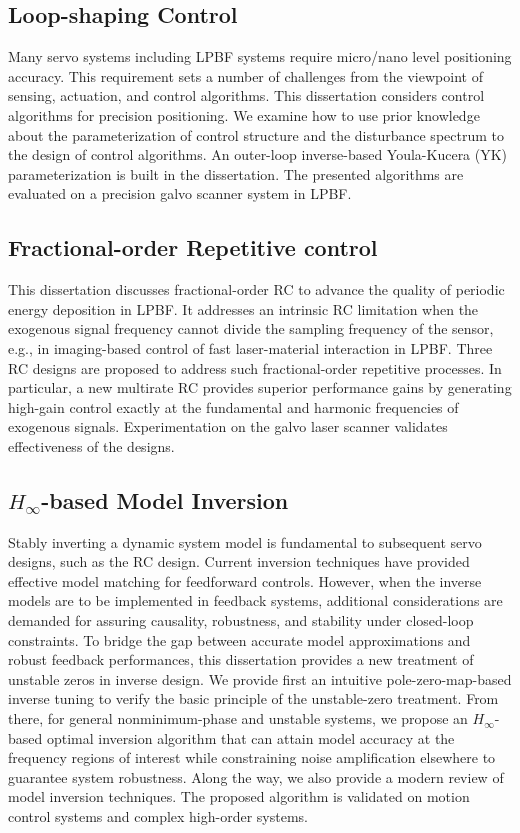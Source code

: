 \documentclass [11pt, proquest] {uwthesis}[2020/02/24]
\begin{document}
\subsection*{Loop-shaping Control}
Many servo systems including LPBF systems require micro/nano level positioning accuracy. This requirement sets a number of challenges from the viewpoint of sensing, actuation, and control algorithms. This dissertation considers control algorithms for precision positioning. We examine how to use prior knowledge about the parameterization of control structure and the disturbance spectrum to the design of control algorithms. An outer-loop inverse-based Youla-Kucera (YK) parameterization is built in the dissertation. The presented algorithms are evaluated on a precision galvo scanner system in LPBF.

\subsection*{Fractional-order Repetitive control}
This dissertation discusses fractional-order RC to advance
the quality of periodic energy deposition in LPBF. It addresses an intrinsic RC limitation when the
exogenous signal frequency cannot divide the sampling frequency of
the sensor, e.g., in imaging-based control of fast laser-material
interaction in LPBF. Three RC designs are proposed to address such fractional-order
repetitive processes. In particular, a new multirate RC provides superior
performance gains by generating high-gain control exactly at the fundamental
and harmonic frequencies of exogenous signals. Experimentation on
the galvo laser scanner validates effectiveness of the designs.

\subsection*{$H_\infty$-based Model Inversion}
Stably inverting a dynamic system model is fundamental to subsequent
servo designs, such as the RC design. Current inversion techniques have provided effective
model matching for feedforward controls. However, when the inverse
models are to be implemented in feedback systems, additional considerations
are demanded for assuring causality, robustness, and stability under
closed-loop constraints. To bridge the gap between accurate model
approximations and robust feedback performances, this dissertation provides
a new treatment of unstable zeros in inverse design. We provide first
an intuitive pole-zero-map-based inverse tuning to verify the basic
principle of the unstable-zero treatment. From there, for general
nonminimum-phase and unstable systems, we propose an $H_\infty$-based optimal inversion
algorithm that can attain model accuracy at the frequency regions
of interest while constraining noise amplification elsewhere to guarantee
system robustness. Along the way, we also provide a modern review
of model inversion techniques. The proposed algorithm is validated
on motion control systems and complex high-order systems.
\end{document}
